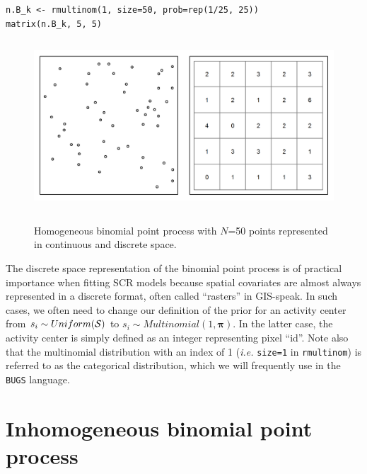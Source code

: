 \begin{verbatim}
n.B_k <- rmultinom(1, size=50, prob=rep(1/25, 25))
matrix(n.B_k, 5, 5)
\end{verbatim}


\begin{figure}
\centering
\includegraphics[width=5in,height=2.5in]{Ch11/figs/homoPlots}
\label{ch9:fig:homo}
\caption{Homogeneous binomial point process with $N$=50 points
  represented in continuous and discrete space.}
\end{figure}


The discrete space representation of the binomial point process is of
practical importance when fitting SCR models because spatial covariates
are almost always represented in a discrete format, often called
``rasters'' in GIS-speak. In such cases, we often need to change our
definition of the prior for an activity center from $s_i \sim
Uniform(\cal{S})$ to $s_i \sim Multinomial(1, \mathbf{\pi})$. In the
latter case, the activity center is simply defined as an integer
representing pixel ``id''. Note also that the multinomial distribution
with an index of 1 (\emph{i.e.} \verb+size=1+ in \verb+rmultinom+)
is referred to as the categorical distribution,
which we will frequently use in the \verb+BUGS+ language.



\section{Inhomogeneous binomial point process}

